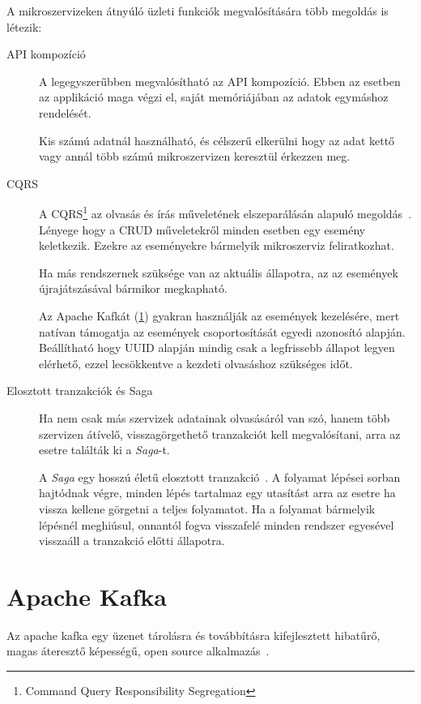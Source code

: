 A mikroszervizeken átnyúló üzleti funkciók megvalósítására több megoldás is létezik:
\begin{description}
	\item[API kompozíció] A legegyszerűbben megvalósítható az API kompozíció. Ebben az esetben az applikáció maga végzi el, saját memóriájában az adatok egymáshoz rendelését. 
	
	Kis számú adatnál használható, és célszerű elkerülni hogy az adat kettő vagy annál több számú mikroszervizen keresztül érkezzen meg.
	
	\item[CQRS] A CQRS\footnote{Command Query Responsibility Segregation} az  olvasás és írás műveletének elszeparálásán alapuló megoldás~\cite{OReally_Microservice_Architecture_CQRS}. Lényege hogy a CRUD műveletekről minden esetben egy esemény keletkezik. Ezekre az eseményekre bármelyik mikroszerviz feliratkozhat.
	
	Ha más rendszernek szüksége van az aktuális állapotra, az az események újrajátszásával bármikor megkapható.	
	 
	Az Apache Kafkát (\ref{sec:apache_kafka}) gyakran használják az események kezelésére, mert natívan támogatja az események csoportosítását egyedi azonosító alapján. Beállítható hogy UUID alapján mindig csak a legfrissebb állapot legyen elérhető, ezzel lecsökkentve a kezdeti olvasáshoz szükséges időt.
		
	\item[Elosztott tranzakciók és Saga] Ha nem csak más szervizek adatainak olvasásáról van szó, hanem több szervizen átívelő, visszagörgethető tranzakciót kell megvalósítani, arra az esetre találták ki a \textit{Saga}-t.
	
	A \textit{Saga} egy hosszú életű elosztott tranzakció~\cite{OReally_Microservice_Architecture_Saga}. A folyamat lépései sorban hajtódnak végre, minden lépés tartalmaz egy utasítást arra az esetre ha vissza kellene görgetni a teljes folyamatot. Ha a folyamat bármelyik lépésnél meghiúsul, onnantól fogva visszafelé minden rendszer egyesével visszaáll a tranzakció előtti állapotra.
\end{description}


\section{Apache Kafka}\label{sec:apache_kafka}
Az apache kafka egy üzenet tárolásra és továbbításra kifejlesztett hibatűrő, magas áteresztő képességű, open source alkalmazás~\cite{OReally_Kafka}.

